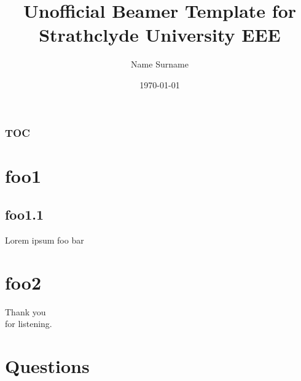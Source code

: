 \documentclass{beamer}
\author{Name Surname}
\title{Unofficial Beamer Template for Strathclyde University EEE}
\date{\today}
\begin{document}
\begin{frame}

\titlepage
\end{frame}

\begin{frame}
	\frametitle{TOC}
	\tableofcontents
\end{frame}

\section{foo1}
\subsection{foo1.1}
\begin{frame}{Lorem ipsum}
foo bar
\end{frame}



\section{foo2}
\begin{frame}
\vfill
\begin{center}\begin{Huge}Thank you \\[10pt]
for listening.\end{Huge}\vfill
\end{center}
\vfill
\end{frame}

\section{Questions}
\vspace*{-1cm}\hspace*{-1.8cm}
\end{document}
